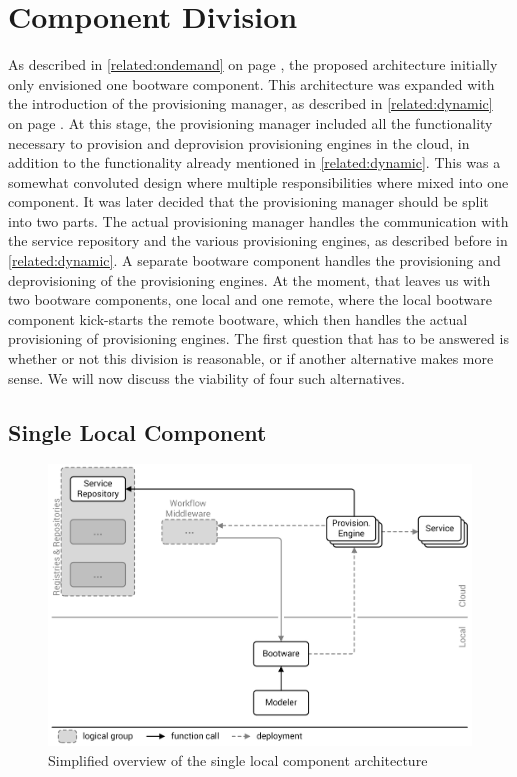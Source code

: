 \section{Component Division}

As described in \autoref{related:ondemand} on page \pageref{related:ondemand}, the proposed architecture initially only envisioned one bootware component.
This architecture was expanded with the introduction of the provisioning manager, as described in \autoref{related:dynamic} on page \pageref{related:dynamic}.
At this stage, the provisioning manager included all the functionality necessary to provision and deprovision provisioning engines in the cloud, in addition to the functionality already mentioned in \autoref{related:dynamic}.
This was a somewhat convoluted design where multiple responsibilities where mixed into one component.
It was later decided that the provisioning manager should be split into two parts.
The actual provisioning manager handles the communication with the service repository and the various provisioning engines, as described before in \autoref{related:dynamic}.
A separate bootware component handles the provisioning and deprovisioning of the provisioning engines.
At the moment, that leaves us with two bootware components, one local and one remote, where the local bootware component kick-starts the remote bootware, which then handles the actual provisioning of provisioning engines.
The first question that has to be answered is whether or not this division is reasonable, or if another alternative makes more sense.
We will now discuss the viability of four such alternatives.

\subsection{Single Local Component}

\begin{figure}[!htbp]
	\centering
	\includegraphics[resolution=600]{design/assets/simple_local}
	\caption{Simplified overview of the single local component architecture}
	\label{image:single_local}
\end{figure}

